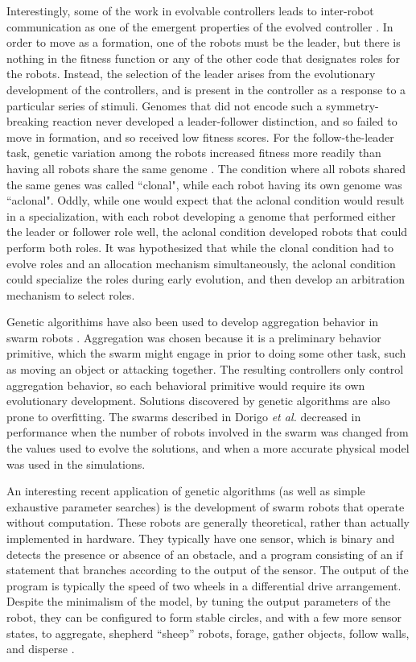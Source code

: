 Interestingly, some of the work in evolvable controllers leads to inter-robot communication as one of the emergent properties of the evolved controller \citep{quinn2001evolving}.
In order to move as a formation, one of the robots must be the leader, but there is nothing in the fitness function or any of the other code that designates roles for the robots. 
Instead, the selection of the leader arises from the evolutionary development of the controllers, and is present in the controller as a response to a particular series of stimuli. 
Genomes that did not encode such a symmetry-breaking reaction never developed a leader-follower distinction, and so failed to move in formation, and so received low fitness scores. 
For the follow-the-leader task, genetic variation among the robots increased fitness more readily than having all robots share the same genome \citep{quinn2001comparison}.
The condition where all robots shared the same genes was called ``clonal", while each robot having its own genome was ``aclonal".
Oddly, while one would expect that the aclonal condition would result in a specialization, with each robot developing a genome that performed either the leader or follower role well, the aclonal condition developed robots that could perform both roles. 
It was hypothesized that while the clonal condition had to evolve roles and an allocation mechanism simultaneously, the aclonal condition could specialize the roles during early evolution, and then develop an arbitration mechanism to select roles.

Genetic algorithims have also been used to develop aggregation behavior in swarm robots \citep{bahgecci2005evolving, dorigo2004evolving}.  
Aggregation was chosen because it is a preliminary behavior primitive, which the swarm might engage in prior to doing some other task, such as moving an object or attacking together.
The resulting controllers only control aggregation behavior, so each behavioral primitive would require its own evolutionary development. 
Solutions discovered by genetic algorithms are also prone to overfitting. 
The swarms described in Dorigo \emph{et al.} decreased in performance when the number of robots involved in the swarm was changed from the values used to evolve the solutions, and when a more accurate physical model was used in the simulations.

An interesting recent application of genetic algorithms (as well as simple exhaustive parameter searches) is the development of swarm robots that operate without computation. 
These robots are generally theoretical, rather than actually implemented in hardware. 
They typically have one sensor, which is binary and detects the presence or absence of an obstacle, and a program consisting of an if statement that branches according to the output of the sensor. 
The output of the program is typically the speed of two wheels in a differential drive arrangement.
Despite the minimalism of the model, by tuning the output parameters of the robot, they can be configured to form stable circles, and with a few more sensor states, to aggregate, shepherd ``sheep'' robots, forage, gather objects, follow walls, and disperse \citep{gauci2014self, johnson2016evolving, ozdemir2017shepherding, brown2018discovery, stcircle}. 

